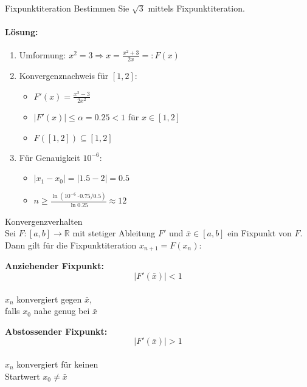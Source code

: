 \begin{example2}{Fixpunktiteration}
Bestimmen Sie $\sqrt{3}$ mittels Fixpunktiteration.

\paragraph{Lösung:}
\begin{enumerate}
    \item Umformung: $x^2 = 3 \Rightarrow x = \frac{x^2+3}{2x} =: F(x)$
    
    \item Konvergenznachweis für $[1,2]$:
    \begin{itemize}
        \item $F'(x) = \frac{x^2-3}{2x^2}$
        \item $|F'(x)| \leq \alpha = 0.25 < 1$ für $x \in [1,2]$
        \item $F([1,2]) \subseteq [1,2]$
    \end{itemize}
    
    \item Für Genauigkeit $10^{-6}$:
    \begin{itemize}
        \item $|x_1-x_0| = |1.5-2| = 0.5$
        \item $n \geq \frac{\ln(10^{-6} \cdot 0.75/0.5)}{\ln 0.25} \approx 12$
    \end{itemize}
\end{enumerate}
\end{example2}

\begin{theorem}{Konvergenzverhalten}\\
Sei $F:[a,b] \rightarrow \mathbb{R}$ mit stetiger Ableitung $F'$ und $\bar{x} \in [a,b]$ ein Fixpunkt von $F$. Dann gilt für die Fixpunktiteration $x_{n+1}=F(x_n)$:
\vspace{1mm}\\
\begin{minipage}[t]{0.45\textwidth}
    \textbf{Anziehender Fixpunkt:}
    \vspace{-3mm}\\
    $$|F'(\bar{x})| < 1$$
    \vspace{-4mm}\\
    $x_n$ konvergiert gegen $\bar{x}$,\\
    falls $x_0$ nahe genug bei $\bar{x}$
\end{minipage}
\hspace{3mm}
\begin{minipage}[t]{0.45\textwidth}
    \textbf{Abstossender Fixpunkt:}
    \vspace{-3mm}\\
    $$|F'(\bar{x})| > 1$$
    \vspace{-4mm}\\
    $x_n$ konvergiert für keinen\\
    Startwert $x_0 \neq \bar{x}$
\end{minipage}
\end{theorem}

